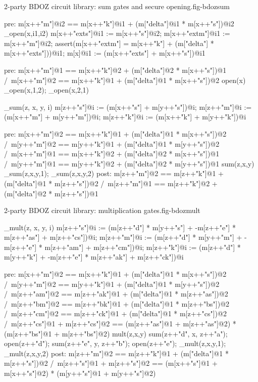 \begin{fpfig}[t]{2-party BDOZ circuit library: sum gates and secure opening.}{fig-bdozsum}
{\footnotesize
\begin{verbatimtab}
   pre: { m[x++"m"]@i2 == m[x++"k"]@i1 + (m["delta"]@i1 * m[x++"s"])@i2 }
   _open(x,i1,i2){
     m[x++"exts"]@i1 := m[x++"s"]@i2;
     m[x++"extm"]@i1 := m[x++"m"]@i2;
     assert(m[x++"extm"] = m[x++"k"] + (m["delta"] * m[x++"exts"]))@i1;
     m[x]@i1 := (m[x++"exts"] + m[x++"s"])@i1
   }

  pre: { m[x++"m"]@1 == m[x++"k"]@2 + (m["delta"]@2 * m[x++"s"])@1 /\
         m[x++"m"]@2 == m[x++"k"]@1 + (m["delta"]@1 * m[x++"s"])@2 }
  open(x) { _open(x,1,2); _open(x,2,1) }
   
  _sum(z, x, y, i){
     m[z++"s"]@i := (m[x++"s"] + m[y++"s"])@i;
     m[z++"m"]@i := (m[x++"m"] + m[y++"m"])@i;
     m[z++"k"]@i := (m[x++"k"] + m[y++"k"])@i
  }

  pre: { m[x++"m"]@2 == m[x++"k"]@1 + (m["delta"]@1 * m[x++"s"])@2 /\
         m[y++"m"]@2 == m[y++"k"]@1 + (m["delta"]@1 * m[y++"s"])@2 /\
         m[x++"m"]@1 == m[x++"k"]@2 + (m["delta"]@2 * m[x++"s"])@1 /\
         m[y++"m"]@1 == m[y++"k"]@2 + (m["delta"]@2 * m[y++"s"])@1 }
  sum(z,x,y){ _sum(z,x,y,1); _sum(z,x,y,2) }
  post: { m[z++"m"]@2 == m[z++"k"]@1 + (m["delta"]@1 * m[z++"s"])@2 /\
          m[z++"m"]@1 == m[z++"k"]@2 + (m["delta"]@2 * m[z++"s"])@1 } 
\end{verbatimtab}
}
\end{fpfig}

\begin{fpfig}[t]{2-party BDOZ circuit library: multiplication gates.}{fig-bdozmult}
{\footnotesize
\begin{verbatimtab}
  _mult(z, x, y, i) {
      m[z++"s"]@i :=
        (m[z++"d"] * m[y++"s"] + -m[z++"e"] * m[z++"as"] + m[z++"cs"])@i;
      m[z++"m"]@i :=
        (m[z++"d"] * m[y++"m"] + -m[z++"e"] * m[z++"am"] + m[z++"cm"])@i;
      m[z++"k"]@i :=
        (m[z++"d"] * m[y++"k"] + -m[z++"e"] * m[z++"ak"] + m[z++"ck"])@i
  }
  
  pre: { m[x++"m"]@2 == m[x++"k"]@1 + (m["delta"]@1 * m[x++"s"])@2 /\
         m[y++"m"]@2 == m[y++"k"]@1 + (m["delta"]@1 * m[y++"s"])@2 /\
         m[z++"am"]@2 == m[z++"ak"]@1 + (m["delta"]@1 * m[z++"as"])@2 /\
         m[z++"bm"]@2 == m[z++"bk"]@1 + (m["delta"]@1 * m[z++"bs"])@2 /\
         m[z++"cm"]@2 == m[z++"ck"]@1 + (m["delta"]@1 * m[z++"cs"])@2 /\
         m[z++"cs"]@1 + m[z++"cs"]@2 ==
            (m[z++"as"]@1 + m[z++"as"]@2) * (m[z++"bs"]@1 + m[z++"bs"]@2)}
  mult(z,x,y) {
      sum(z++"d", x, z++"a");
      open(z++"d");
      sum(z++"e", y, z++"b");
      open(z++"e"); 
      _mult(z,x,y,1); _mult(z,x,y,2)
  }
  post: {  m[z++"m"]@2 == m[z++"k"]@1 + (m["delta"]@1 * m[z++"s"])@2 /\
           m[z++"s"]@1 + m[z++"s"]@2 ==
              (m[x++"s"]@1 + m[x++"s"]@2) * (m[y++"s"]@1 + m[y++"s"]@2) } 
  
\end{verbatimtab}
}
\end{fpfig}

